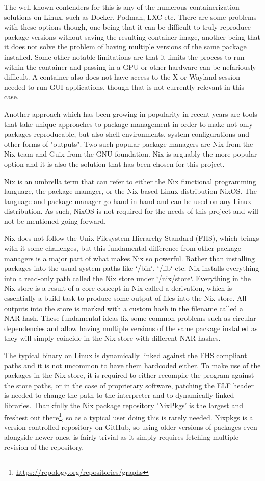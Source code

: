 The well-known contenders for this is any of the numerous containerization solutions on Linux, such as Docker, Podman, LXC etc. There are some problems with these options though, one being that it can be difficult to truly reproduce package versions without saving the resulting container image, another being that it does not solve the problem of having multiple versions of the same package installed. Some other notable limitations are that it limits the process to run within the container and passing in a GPU or other hardware can be nefariously difficult. A container also does not have access to the X or Wayland session needed to run GUI applications, though that is not currently relevant in this case.

Another approach which has been growing in popularity in recent years are tools that take unique approaches to package management in order to make not only packages reproducable, but also shell environments, system configurations and other forms of "outputs". Two such popular package managers are Nix from the Nix team and Guix from the GNU foundation. Nix is arguably the more popular option and it is also the solution that has been chosen for this project.

Nix is an umbrella term that can refer to either the Nix functional programming language, the package manager, or the Nix based Linux distribution NixOS. The language and package manager go hand in hand and can be used on any Linux distribution. As such, NixOS is not required for the needs of this project and will not be mentioned going forward.

Nix does not follow the Unix Filesystem Hierarchy Standard (FHS), which brings with it some challenges, but this fundamental difference from other package managers is a major part of what makes Nix so powerful.
Rather than installing packages into the usual system paths like `/bin`, `/lib` etc. Nix installs everything into a read-only path called the Nix store under `/nix/store`.
Everything in the Nix store is a result of a core concept in Nix called a derivation, which is essentially a build task to produce some output of files into the Nix store.
All outputs into the store is marked with a custom hash in the filename called a NAR hash. These fundamental ideas fix some common problems such as circular dependencies and allow having multiple versions of the same package installed as they will simply coincide in the Nix store with different NAR hashes.

The typical binary on Linux is dynamically linked against the FHS compliant paths and it is not uncommon to have them hardcoded either. To make use of the packages in the Nix store, it is required to either recompile the program against the store paths, or in the case of proprietary software, patching the ELF header is needed to change the path to the interpreter and to dynamically linked libraries. Thankfully the Nix package repository 'NixPkgs' is the largest and freshest out there\footnote{\url{https://repology.org/repositories/graphs}}, so as a typical user doing this is rarely needed.
Nixpkgs is a version-controlled repository on GitHub, so using older versions of packages even alongside newer ones, is fairly trivial as it simply requires fetching multiple revision of the repository.

